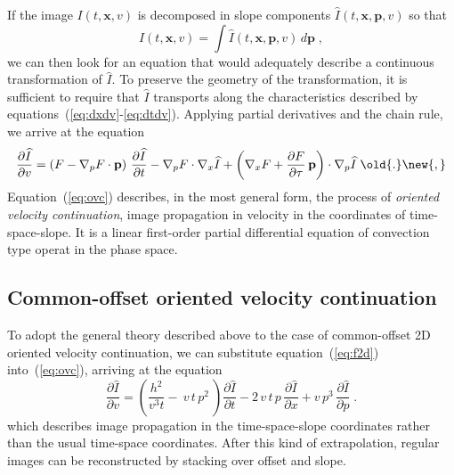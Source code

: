 If the image $I(t,\mathbf{x},v)$ is decomposed in slope components $\widehat{I}(t,\mathbf{x},\mathbf{p},v)$ so that
\begin{equation}
\label{eq:txp}  
I(t,\mathbf{x},v) = \int \widehat{I}(t,\mathbf{x},\mathbf{p},v)\,d\mathbf{p}\;,
\end{equation}
we can then look for an equation that would adequately describe a continuous
transformation of $\widehat{I}$. To preserve the geometry of the
transformation, it is sufficient to require that $\widehat{I}$ transports
along the characteristics described by
equations~(\ref{eq:dxdv}-\ref{eq:dtdv}). Applying partial derivatives
and the chain rule, we arrive at the 
equation 
\begin{equation}
\label{eq:ovc}
\frac{\partial \widehat{I}}{\partial v} = \left(F - \nabla_p F \cdot \mathbf{p}\right)\,\frac{\partial \widehat{I}}{\partial t} - \nabla_p F \cdot \nabla_x  \widehat{I} + \left(\nabla_x F + \frac{\partial F}{\partial \tau}\,\mathbf{p}\right) \cdot \nabla_p \widehat{I}\;\old{.}\new{,}
\end{equation} 
Equation~(\ref{eq:ovc}) describes, in the most general form, the
process of \emph{oriented velocity continuation}, image propagation
in velocity in the coordinates of time-space-slope. It is a linear
first-order partial differential equation of convection type \old{-} operat in the phase space.

\subsection{Common-offset oriented velocity continuation}
To adopt the general theory described above to the case of
common-offset 2D oriented velocity continuation, we can substitute
equation~(\ref{eq:f2d}) into~(\ref{eq:ovc}), arriving at the
equation
\begin{equation}
\label{eq:ovc2d}
\frac{\partial \widehat{I}}{\partial v} = \left(\frac{h^2}{v^3t} -\ v\,t\,p^2\ \right)\frac{\partial \widehat{I}}{\partial t} - 2\,v\,t\,p\,\frac{\partial \widehat{I}}{\partial x} + v\,p^3\,\frac{\partial \widehat{I}}{\partial p}\;.
\end{equation} 
which describes image
propagation in the time-space-slope coordinates rather than the usual
time-space coordinates. After this kind of extrapolation, regular
images can be reconstructed by stacking over offset and slope.

